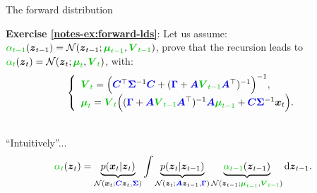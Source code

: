 \documentclass{beamer}
\newcommand{\MN}{{\mathcal N}}
\newcommand{\bs}[1]{\boldsymbol{#1}}
\newcommand{\exercise}[2]{\noindent\colorbox{blue!10}{\parbox{0.995\textwidth}{\textbf{Exercise \ref{notes-ex:#1}}: #2}}\\}
\newcommand{\paint}[2]{{\color{#1}#2}}
\begin{document}
\begin{frame}{The forward distribution}
\exercise{forward-lds}{Let us assume: $\paint{mygreen}{\alpha_{t-1}}(\bs{z}_{t-1}) = {\cal N}(\bs{z}_{t-1};\paint{mygreen}{\boldsymbol{\mu}_{t-1}},\paint{mygreen}{\bs{V}_{t-1}})$, prove that the recursion leads to $\paint{mygreen}{\alpha_t}(\bs{z}_t) = \MN(\bs{z}_t; \paint{mygreen}{\bs{\mu}_t}, \paint{mygreen}{\bs{V}_t})$, with:
 \begin{equation*}
 \left\{\begin{array}{l}
 \paint{mygreen}{\bs{V}_t} = \Big(\paint{myblue}{\bs{C}}^\top\paint{myblue}{\bs{\Sigma}}^{-1}\paint{myblue}{\bs{C}} + (\paint{myblue}{\bs{\Gamma}}+\paint{myblue}{\bs{A}}\paint{mygreen}{\bs{V}_{t-1}}\paint{myblue}{\bs{A}}^\top)^{-1}\Big)^{-1},
 \\ \paint{mygreen}{\boldsymbol{\mu}_t}=\paint{mygreen}{\bs{V}_t}\Big( (\paint{myblue}{\bs{\Gamma}}+\paint{myblue}{\bs{A}}\paint{mygreen}{\bs{V}_{t-1}}\paint{myblue}{\bs{A}}^\top)^{-1}\paint{myblue}{\bs{A}}\paint{mygreen}{\boldsymbol{\mu}_{t-1}} + \paint{myblue}{\bs{C}}\paint{myblue}{\bs{\Sigma}}^{-1} \bs{x}_t\Big).
 \end{array}\right.
\end{equation*}
}
\vspace{3mm}
``Intuitively''...
\begin{equation*}
 \paint{mygreen}{\alpha_t}(\bs{z}_t) = \underbrace{p(\bs{x}_t|\bs{z}_t)}_{\MN(\bs{x}_t;\paint{myblue}{\bs{C}}\bs{z}_{t},\paint{myblue}{\bs{\Sigma}})}\int \underbrace{p(\bs{z}_t|\bs{z}_{t-1})}_{\MN(\bs{z}_t;\paint{myblue}{\bs{A}}\bs{z}_{t-1},\paint{myblue}{\bs{\Gamma}})}\underbrace{\paint{mygreen}{\alpha_{t-1}}(\bs{z}_{t-1})}_{{\cal N}(\bs{z}_{t-1};\paint{mygreen}{\boldsymbol{\mu}_{t-1}},\paint{mygreen}{\bs{V}_{t-1}})}\textrm{d}\bs{z}_{t-1}.
\end{equation*}

\end{frame}
% 
\end{document}
